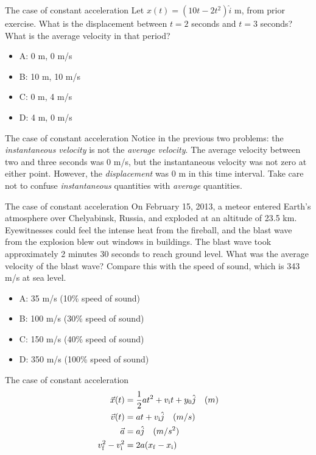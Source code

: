 \documentclass{beamer}
\begin{document}
\begin{frame}{The case of constant acceleration}
Let $x(t) = (10t-2t^2)\hat{i}$ m, from prior exercise.  What is the displacement between $t=2$ seconds and $t=3$ seconds?  What is the average velocity in that period?
\begin{itemize}
\item A: 0 m, 0 m/s
\item B: 10 m, 10 m/s
\item C: 0 m, 4 m/s
\item D: 4 m, 0 m/s
\end{itemize}
\end{frame}

\begin{frame}{The case of constant acceleration}
Notice in the previous two problems: the \textit{instantaneous velocity} is not the \textit{average velocity}.  The average velocity between two and three seconds was 0 m/s, but the instantaneous velocity was not zero at either point.  However, the \textit{displacement} was 0 m in this time interval.  Take care not to confuse \textit{instantaneous} quantities with \textit{average} quantities.
\end{frame}

\begin{frame}{The case of constant acceleration}
\small
On February 15, 2013, a meteor entered Earth’s atmosphere over Chelyabinsk, Russia, and exploded at an altitude of 23.5 km.  Eyewitnesses could feel the intense heat from the fireball, and the blast wave from the explosion blew out windows in buildings. The blast wave took approximately 2 minutes 30 seconds to reach ground level.  What was the average velocity of the blast wave?  Compare this with the speed of sound, which is 343 m/s at sea level.
\begin{itemize}
\item A: 35 m/s (10\% speed of sound)
\item B: 100 m/s (30\% speed of sound)
\item C: 150 m/s (40\% speed of sound)
\item D: 350 m/s (100\% speed of sound)
\end{itemize}
\end{frame}

\begin{frame}{The case of constant acceleration}
\begin{align}
\vec{x}(t) &= \frac{1}{2}at^2+v_{\rm i}t+y_{\rm 0} \hat{j} \quad (m) \label{eq:summary1} \\
\vec{v}(t) &= at + v_{\rm i} \hat{j} \quad (m/s) \label{eq:summary2} \\
\vec{a} &= a \hat{j} \quad (m/s^2) \label{eq:summary3} \\
v_{\rm f}^2 - v_{\rm i}^2 &= 2a(x_{\rm f}-x_{\rm i}) \label{eq:summary4}
\end{align}
\end{frame}
\end{document}
